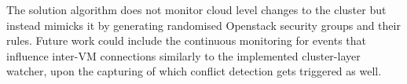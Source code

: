 The solution algorithm does not monitor cloud level changes to the cluster but instead mimicks it by generating randomised Openstack security groups and their rules. Future work could include the continuous monitoring for events that influence inter-VM connections similarly to the implemented cluster-layer watcher, upon the capturing of which conflict detection gets triggered as well.
\\[10pt]



\cleardoublepage
